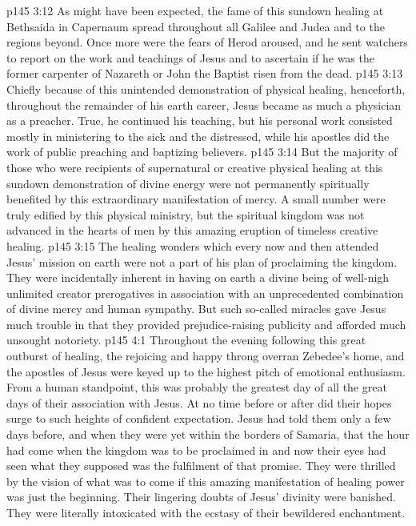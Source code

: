 \vs p145 3:12 \pc As might have been expected, the fame of this sundown healing at Bethsaida in Capernaum spread throughout all Galilee and Judea and to the regions beyond. Once more were the fears of Herod aroused, and he sent watchers to report on the work and teachings of Jesus and to ascertain if he was the former carpenter of Nazareth or John the Baptist risen from the dead.
\vs p145 3:13 Chiefly because of this unintended demonstration of physical healing, henceforth, throughout the remainder of his earth career, Jesus became as much a physician as a preacher. True, he continued his teaching, but his personal work consisted mostly in ministering to the sick and the distressed, while his apostles did the work of public preaching and baptizing believers.
\vs p145 3:14 But the majority of those who were recipients of supernatural or creative physical healing at this sundown demonstration of divine energy were not permanently spiritually benefited by this extraordinary manifestation of mercy. A small number were truly edified by this physical ministry, but the spiritual kingdom was not advanced in the hearts of men by this amazing eruption of timeless creative healing.
\vs p145 3:15 The healing wonders which every now and then attended Jesus’ mission on earth were not a part of his plan of proclaiming the kingdom. They were incidentally inherent in having on earth a divine being of well\hyp{}nigh unlimited creator prerogatives in association with an unprecedented combination of divine mercy and human sympathy. But such so\hyp{}called miracles gave Jesus much trouble in that they provided prejudice\hyp{}raising publicity and afforded much unsought notoriety.
\vs p145 4:1 Throughout the evening following this great outburst of healing, the rejoicing and happy throng overran Zebedee’s home, and the apostles of Jesus were keyed up to the highest pitch of emotional enthusiasm. From a human standpoint, this was probably the greatest day of all the great days of their association with Jesus. At no time before or after did their hopes surge to such heights of confident expectation. Jesus had told them only a few days before, and when they were yet within the borders of Samaria, that the hour had come when the kingdom was to be proclaimed in  and now their eyes had seen what they supposed was the fulfilment of that promise. They were thrilled by the vision of what was to come if this amazing manifestation of healing power was just the beginning. Their lingering doubts of Jesus’ divinity were banished. They were literally intoxicated with the ecstasy of their bewildered enchantment.
